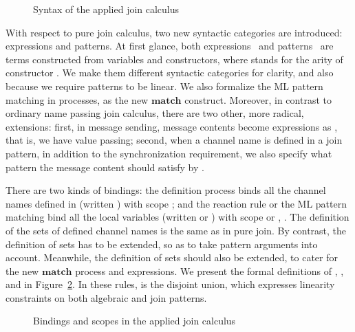 \documentclass{LMCS}
\newcommand{\kwd}[1]{\ensuremath{\mathbf{#1}}}
\renewcommand{\_}{\mathord{\rule[-.25ex]{1ex}{.15ex}}}
\begin{document}
\begin{figure}[ht]
\centering

\caption{Syntax of the applied join calculus}\label{fig.syntax}
\end{figure}

With respect to pure join calculus, two new syntactic categories are
introduced: expressions and patterns.  At first glance, both
expressions~ and patterns~ are terms constructed from
variables and constructors, where  stands for the arity of
constructor .  We make them different syntactic categories
for clarity, and also because we require patterns to be linear. We
also formalize the ML pattern matching in processes, as the new
\kwd{match} construct.  Moreover, in contrast to ordinary name passing
join calculus, there are two other, more radical, extensions: first,
in message sending, message contents become expressions as ,
that is, we have value passing; second, when a channel name is defined
in a join pattern, in addition to the synchronization requirement, we
also specify what pattern the message content should satisfy by
.

There are two kinds of bindings: the definition process
 binds all the channel names defined in  (written
) with scope ; and the reaction rule  or
the ML pattern matching  bind all the local
variables (written  or ) with scope  or ,
. The definition of the sets of defined
channel names  is the same as in pure join.  By contrast,
the definition of sets  has to be extended, so as to take
pattern arguments into account. Meanwhile, the definition of sets
 should also be extended, to cater for the new \kwd{match}
process and expressions. We present the formal definitions of
, , and  in
Figure~\ref{fig.scope}. In these rules,  is the disjoint
union, which expresses linearity constraints on both algebraic and
join patterns.

\begin{figure}[!p]
\centering

\caption{Bindings and scopes in the applied join
  calculus}\label{fig.scope}
\end{figure}
\end{document}
